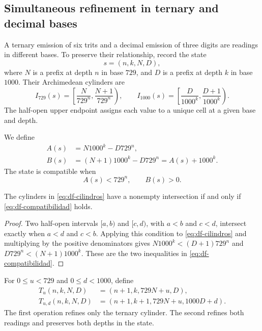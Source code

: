 \subsection{Simultaneous refinement in ternary and decimal bases}
\label{subsec:df-cilindros-mixtos}


A ternary emission of six trits and a decimal emission of three digits
are readings in different bases. To preserve their relationship, record
the state
\[
 s=(n,k,N,D),
\]
where \(N\) is a prefix at depth \(n\) in base \(729\), and \(D\) is
a prefix at depth \(k\) in base \(1000\). Their Archimedean cylinders are
\begin{equation}
 I_{729}(s)=\left[\frac{N}{729^n},\frac{N+1}{729^n}\right),\qquad
 I_{1000}(s)=\left[\frac{D}{1000^k},\frac{D+1}{1000^k}\right).
 \label{eq:df-cilindros}
\end{equation}
The half-open upper endpoint assigns each value to a unique cell at a
given base and depth.

\begin{definition}
We define
\begin{align}
 A(s)&=N1000^k-D729^n,\label{eq:df-defecto-inferior}\\
 B(s)&=(N+1)1000^k-D729^n=A(s)+1000^k.
 \label{eq:df-defecto-superior}
\end{align}
The state is compatible when
\begin{equation}
 A(s)<729^n,\qquad B(s)>0.
 \label{eq:df-compatibilidad}
\end{equation}
\end{definition}

\begin{lemma}
The cylinders in \eqref{eq:df-cilindros} have a nonempty intersection if
and only if \eqref{eq:df-compatibilidad} holds.
\end{lemma}

\begin{proof}
Two half-open intervals \([a,b)\) and \([c,d)\), with \(a<b\) and
\(c<d\), intersect exactly when \(a<d\) and \(c<b\). Applying this
condition to \eqref{eq:df-cilindros} and multiplying by the positive
denominators gives
\(N1000^k<(D+1)729^n\) and
\(D729^n<(N+1)1000^k\). These are the two inequalities in
\eqref{eq:df-compatibilidad}.
\end{proof}

\begin{definition}
For \(0\leq u<729\) and \(0\leq d<1000\), define
\begin{align*}
 T_u(n,k,N,D)&=(n+1,k,729N+u,D),\\
 T_{u,d}(n,k,N,D)&=(n+1,k+1,729N+u,1000D+d).
\end{align*}
The first operation refines only the ternary cylinder. The second refines
both readings and preserves both depths in the state.
\end{definition}

